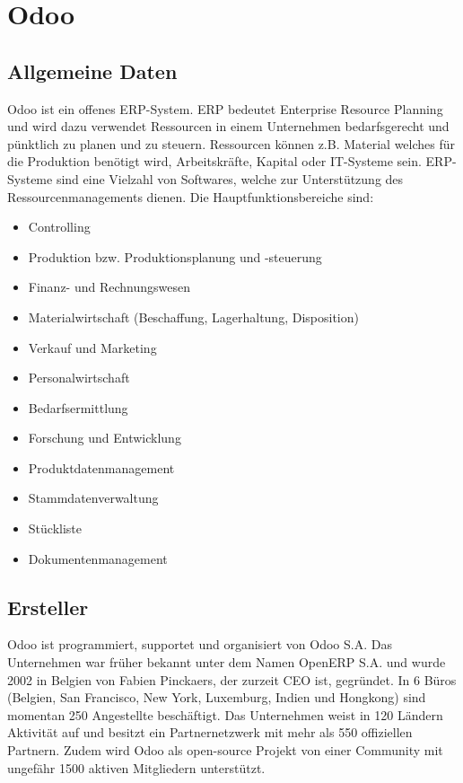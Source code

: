 \section{Odoo}

\subsection{Allgemeine Daten}
Odoo ist ein offenes ERP-System. ERP bedeutet Enterprise Resource Planning und wird dazu verwendet Ressourcen in einem Unternehmen bedarfsgerecht und pünktlich zu planen und zu steuern. Ressourcen können z.B. Material welches für die Produktion benötigt wird, Arbeitskräfte, Kapital oder IT-Systeme sein. ERP-Systeme sind eine Vielzahl von Softwares, welche zur Unterstützung des Ressourcenmanagements dienen. Die Hauptfunktionsbereiche sind:
\begin{itemize}
	\item Controlling
	\item Produktion bzw. Produktionsplanung und -steuerung
	\item Finanz- und Rechnungswesen
	\item Materialwirtschaft (Beschaffung, Lagerhaltung, Disposition)
	\item Verkauf und Marketing
	\item Personalwirtschaft
	\item Bedarfsermittlung
	\item Forschung und Entwicklung
	\item Produktdatenmanagement
	\item Stammdatenverwaltung
	\item Stückliste
	\item Dokumentenmanagement
\end{itemize}


\subsection{Ersteller}
Odoo ist programmiert, supportet und organisiert von Odoo S.A. Das Unternehmen war früher bekannt unter dem Namen OpenERP S.A. und wurde 2002 in Belgien von Fabien Pinckaers, der zurzeit CEO ist, gegründet. In 6 Büros (Belgien, San Francisco, New York, Luxemburg, Indien und Hongkong) sind momentan 250 Angestellte beschäftigt. Das Unternehmen weist in 120 Ländern Aktivität auf und besitzt ein Partnernetzwerk mit mehr als 550 offiziellen Partnern. Zudem wird Odoo als open-source Projekt von einer Community mit ungefähr 1500 aktiven Mitgliedern unterstützt.

